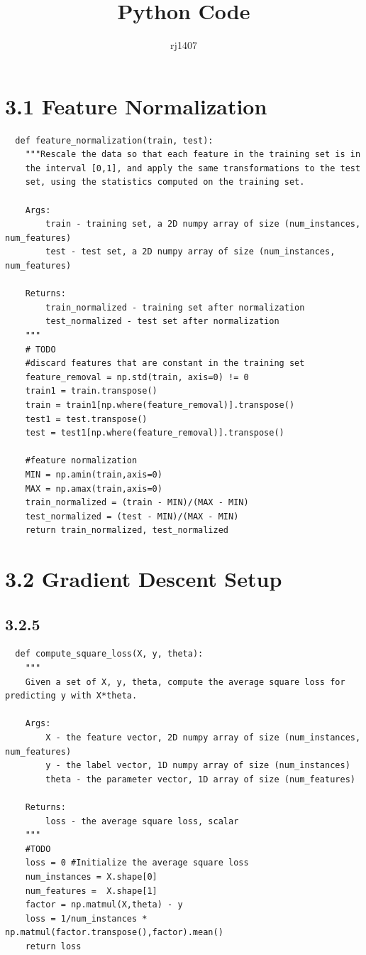 \documentclass{article}
\title{Python Code}
\author{rj1407 }
\begin{document}
\section{3.1 Feature Normalization}
\begin{verbatim}
  def feature_normalization(train, test):
    """Rescale the data so that each feature in the training set is in
    the interval [0,1], and apply the same transformations to the test
    set, using the statistics computed on the training set.

    Args:
        train - training set, a 2D numpy array of size (num_instances, num_features)
        test - test set, a 2D numpy array of size (num_instances, num_features)

    Returns:
        train_normalized - training set after normalization
        test_normalized - test set after normalization
    """
    # TODO
    #discard features that are constant in the training set
    feature_removal = np.std(train, axis=0) != 0
    train1 = train.transpose()
    train = train1[np.where(feature_removal)].transpose()
    test1 = test.transpose()
    test = test1[np.where(feature_removal)].transpose()
    
    #feature normalization
    MIN = np.amin(train,axis=0)
    MAX = np.amax(train,axis=0)
    train_normalized = (train - MIN)/(MAX - MIN)
    test_normalized = (test - MIN)/(MAX - MIN)
    return train_normalized, test_normalized
\end{verbatim}

\section{3.2 Gradient Descent Setup}
\subsection{3.2.5}
\begin{verbatim}
  def compute_square_loss(X, y, theta):
    """
    Given a set of X, y, theta, compute the average square loss for predicting y with X*theta.

    Args:
        X - the feature vector, 2D numpy array of size (num_instances, num_features)
        y - the label vector, 1D numpy array of size (num_instances)
        theta - the parameter vector, 1D array of size (num_features)

    Returns:
        loss - the average square loss, scalar
    """
    #TODO
    loss = 0 #Initialize the average square loss
    num_instances = X.shape[0]
    num_features =  X.shape[1]
    factor = np.matmul(X,theta) - y
    loss = 1/num_instances * np.matmul(factor.transpose(),factor).mean()
    return loss
\end{verbatim}
\endsubsection
\end{document}
